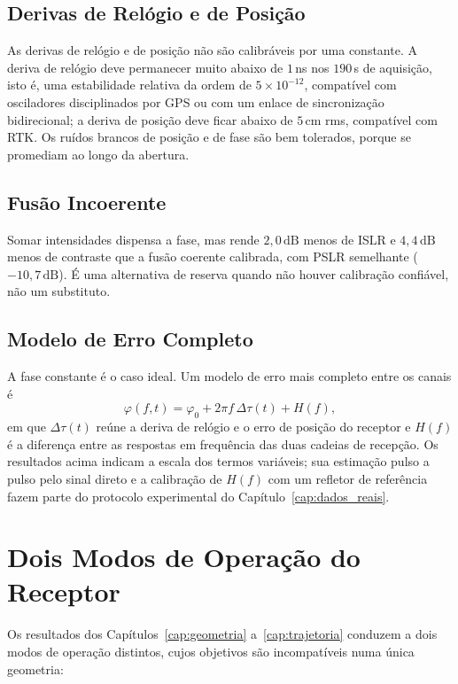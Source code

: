 \documentclass[12pt,a4paper,oneside]{book}
\theoremstyle{remark}
\newcommand{\dB}{\,\mathrm{dB}}
\theoremstyle{plain}
\theoremstyle{definition}
\begin{document}
\subsection{Derivas de Relógio e de Posição}

As derivas de relógio e de posição não são calibráveis por
uma constante. A deriva de relógio deve permanecer muito abaixo de $1\,$ns nos
$190\,$s de aquisição, isto é, uma estabilidade relativa da ordem de
$5\times10^{-12}$, compatível com osciladores disciplinados por GPS ou com um
enlace de sincronização bidirecional; a deriva de posição deve ficar abaixo de
$5\,$cm rms, compatível com RTK. Os ruídos brancos de posição e de fase são bem
tolerados, porque se promediam ao longo da abertura.

\subsection{Fusão Incoerente}

Somar intensidades dispensa a fase, mas rende
$2,0\dB$ menos de ISLR e $4,4\dB$ menos de contraste que a fusão coerente calibrada,
com PSLR semelhante ($-10,7\dB$). É uma alternativa de reserva quando não houver
calibração confiável, não um substituto.

\subsection{Modelo de Erro Completo}

A fase constante é o caso ideal. Um modelo
de erro mais completo entre os canais é
\begin{equation}
  \varphi(f,t)=\varphi_0+2\pi f\,\Delta\tau(t)+H(f),
  \label{eq:erro_fase}
\end{equation}
em que $\Delta\tau(t)$ reúne a deriva de relógio e o erro de posição do receptor e
$H(f)$ é a diferença entre as respostas em frequência das duas cadeias de
recepção. Os resultados acima indicam a escala dos termos variáveis; sua
estimação pulso a pulso pelo sinal direto e a calibração de $H(f)$ com um refletor
de referência fazem parte do protocolo experimental do
Capítulo~\ref{cap:dados_reais}.

\section{Dois Modos de Operação do Receptor}
\label{sec:traj_modos}

Os resultados dos Capítulos~\ref{cap:geometria} a~\ref{cap:trajetoria} conduzem
a dois modos de operação distintos, cujos objetivos são incompatíveis numa única
geometria:
\end{document}
